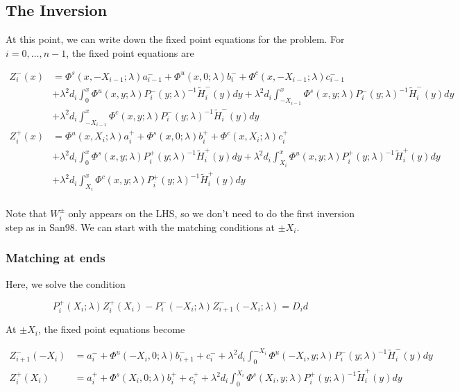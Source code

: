 \documentclass[12pt]{article}
\begin{document}
\subsection*{The Inversion}

At this point, we can write down the fixed point equations for the problem. For $i = 0, \dots, n-1$, the fixed point equations are

\begin{align*}
Z_i^-(x) &= \Phi^s(x, -X_{i-1}; \lambda) a_{i-1}^- + \Phi^u(x, 0; \lambda) b_i^- + \Phi^c(x, -X_{i-1}; \lambda) c_{i-1}^- \\
&+ \lambda^2 d_i \int_0^x \Phi^u(x, y; \lambda) P_i^-(y; \lambda)^{-1} \tilde{H}_i^-(y) dy
+ \lambda^2 d_i \int_{-X_{i-1}}^x \Phi^s(x, y; \lambda) P_i^-(y; \lambda)^{-1} \tilde{H}_i^-(y) dy \\
&+ \lambda^2 d_i \int_{-X_{i-1}}^x \Phi^c(x, y; \lambda) P_i^-(y; \lambda)^{-1} \tilde{H}_i^-(y) dy  \\ 
Z_i^+(x) &= \Phi^u(x, X_i; \lambda) a_i^+ + \Phi^s(x, 0; \lambda) b_i^+ + \Phi^c(x, X_i; \lambda) c_i^+ \\
&+ \lambda^2 d_i \int_0^x \Phi^s(x, y; \lambda) P_i^+(y; \lambda)^{-1} \tilde{H}_i^+(y) dy
+ \lambda^2 d_i \int_{X_i}^x \Phi^u(x, y; \lambda) P_i^+(y; \lambda)^{-1} \tilde{H}_i^+(y) dy \\
&+ \lambda^2 d_i \int_{X_i}^x \Phi^c(x, y; \lambda) P_i^+(y; \lambda)^{-1} \tilde{H}_i^+(y) dy \\
\end{align*}

Note that $W_i^\pm$ only appears on the LHS, so we don't need to do the first inversion step as in San98. We can start with the matching conditions at $\pm X_i$.

\subsubsection*{Matching at ends}

Here, we solve the condition

\[
P_i^+(X_i; \lambda) Z_i^+(X_i) - P_i^-(-X_i; \lambda) Z_{i+1}^-(-X_i; \lambda) = D_i d
\]

At $\pm X_i$, the fixed point equations become

\begin{align*}
Z_{i+1}^-(-X_i) &= a_i^- + \Phi^u(-X_i, 0; \lambda) b_{i+1}^- + c_i^- 
+ \lambda^2 d_i \int_0^{-X_i} \Phi^u(-X_i, y; \lambda) P_i^-(y; \lambda)^{-1} \tilde{H}_i^-(y) dy \\ 
Z_i^+(X_i) &= a_i^+ + \Phi^s(X_i, 0; \lambda) b_i^+ + c_i^+ 
+ \lambda^2 d_i \int_0^{X_i} \Phi^s(X_i, y; \lambda) P_i^+(y; \lambda)^{-1} \tilde{H}_i^+(y) dy
\end{align*}
\end{document}

